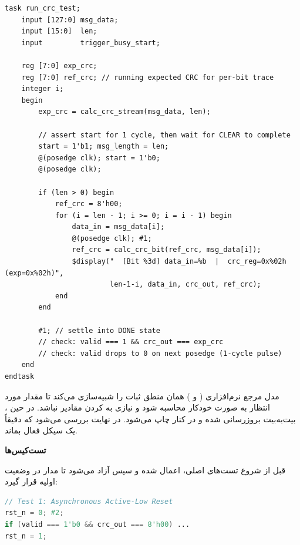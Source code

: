 \begin{latin}
    \begin{lstlisting}[basicstyle=\ttfamily\small, breaklines=true,
                   postbreak=\mbox{\textcolor{red}{$\hookrightarrow$}\space}]
task run_crc_test;
    input [127:0] msg_data;
    input [15:0]  len;
    input         trigger_busy_start;

    reg [7:0] exp_crc;
    reg [7:0] ref_crc; // running expected CRC for per-bit trace
    integer i;
    begin
        exp_crc = calc_crc_stream(msg_data, len);

        // assert start for 1 cycle, then wait for CLEAR to complete
        start = 1'b1; msg_length = len;
        @(posedge clk); start = 1'b0;
        @(posedge clk);

        if (len > 0) begin
            ref_crc = 8'h00;
            for (i = len - 1; i >= 0; i = i - 1) begin
                data_in = msg_data[i];
                @(posedge clk); #1;
                ref_crc = calc_crc_bit(ref_crc, msg_data[i]);
                $display("  [Bit %3d] data_in=%b  |  crc_reg=0x%02h (exp=0x%02h)",
                         len-1-i, data_in, crc_out, ref_crc);
            end
        end

        #1; // settle into DONE state
        // check: valid === 1 && crc_out === exp_crc
        // check: valid drops to 0 on next posedge (1-cycle pulse)
    end
endtask
\end{lstlisting}
\end{latin}

مدل مرجع نرم‌افزاری ( و )
همان منطق ثبات  را شبیه‌سازی می‌کند تا مقدار مورد انتظار به صورت
خودکار محاسبه شود و نیازی به  کردن مقادیر نباشد. در حین
،  بیت‌به‌بیت بروزرسانی شده و در کنار
 چاپ می‌شود. در نهایت بررسی می‌شود که  دقیقاً
یک سیکل فعال بماند.

\pagebreak

\textbf{تست‌کیس‌ها}

قبل از شروع تست‌های اصلی،  اعمال شده و سپس آزاد می‌شود تا مدار
در وضعیت اولیه قرار گیرد:

\begin{latin}
    \begin{lstlisting}[language=Verilog]
// Test 1: Asynchronous Active-Low Reset
rst_n = 0; #2;
if (valid === 1'b0 && crc_out === 8'h00) ...
rst_n = 1;
\end{lstlisting}
\end{latin}

